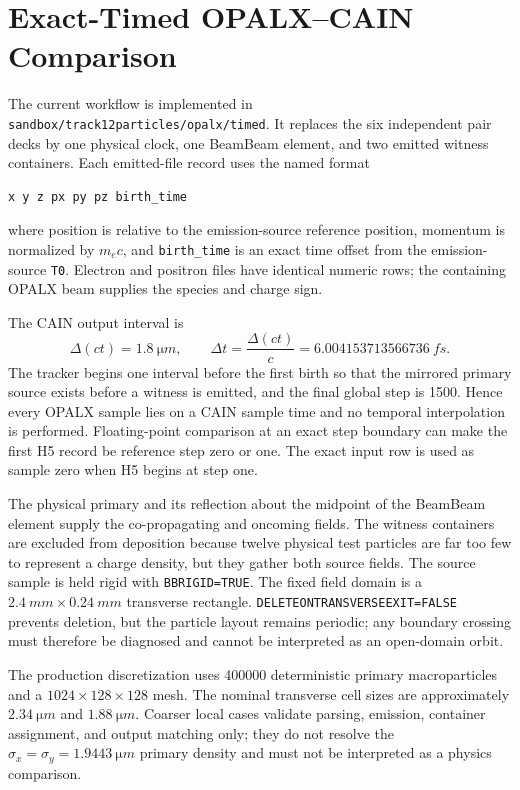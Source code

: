\documentclass[11pt]{article}
\begin{document}
\section{Exact-Timed OPALX--CAIN Comparison}

The current workflow is implemented in
\texttt{sandbox/track12particles/opalx/timed}.  It replaces the six independent
pair decks by one physical clock, one BeamBeam element, and two emitted witness
containers.  Each emitted-file record uses the named format
\begin{verbatim}
x y z px py pz birth_time
\end{verbatim}
where position is relative to the emission-source reference position,
momentum is normalized by \(m_e c\), and \texttt{birth\_time} is an exact time
offset from the emission-source \texttt{T0}.  Electron and positron files have
identical numeric rows; the containing OPALX beam supplies the species and
charge sign.

The CAIN output interval is
\[
  \Delta(ct)=\SI{1.8}{\micro m},\qquad
  \Delta t=\frac{\Delta(ct)}{c}
           =\SI{6.004153713566736}{fs}.
\]
The tracker begins one interval before the first birth so that the mirrored
primary source exists before a witness is emitted, and the final global step
is 1500.  Hence every OPALX sample lies on a CAIN sample time and no temporal
interpolation is performed.  Floating-point comparison at an exact step
boundary can make the first H5 record be reference step zero or one.  The exact
input row is used as sample zero when H5 begins at step one.

The physical primary and its reflection about the midpoint of the BeamBeam
element supply the co-propagating and oncoming fields.  The witness containers
are excluded from deposition because twelve physical test particles are far
too few to represent a charge density, but they gather both source fields.
The source sample is held rigid with \texttt{BBRIGID=TRUE}.  The fixed field
domain is a \(\SI{2.4}{mm}\times\SI{0.24}{mm}\) transverse rectangle.
\texttt{DELETEONTRANSVERSEEXIT=FALSE} prevents deletion, but the particle
layout remains periodic; any boundary crossing must therefore be diagnosed and
cannot be interpreted as an open-domain orbit.

The production discretization uses 400000 deterministic primary
macroparticles and a \(1024\times128\times128\) mesh.  The nominal transverse
cell sizes are approximately \(\SI{2.34}{\micro m}\) and
\(\SI{1.88}{\micro m}\).  Coarser local cases validate parsing, emission,
container assignment, and output matching only; they do not resolve the
\(\sigma_x=\sigma_y=\SI{1.9443}{\micro m}\) primary density and must not be
interpreted as a physics comparison.
\end{document}

